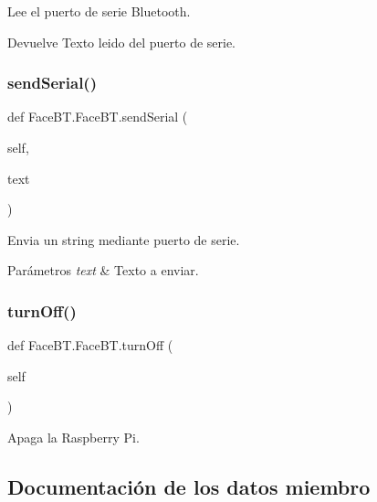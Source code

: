Lee el puerto de serie Bluetooth. 

\begin{DoxyReturn}{Devuelve}
Texto leido del puerto de serie. 
\end{DoxyReturn}
\mbox{\label{class_face_b_t_1_1_face_b_t_a6f362adf4c828653782877a661b4714d}} 
\subsubsection{\texorpdfstring{send\+Serial()}{sendSerial()}}
{\footnotesize\ttfamily def Face\+B\+T.\+Face\+B\+T.\+send\+Serial (\begin{DoxyParamCaption}\item[{}]{self,  }\item[{}]{text }\end{DoxyParamCaption})}



Envia un string mediante puerto de serie. 


\begin{DoxyParams}{Parámetros}
{\em text} & Texto a enviar. \\
\hline
\end{DoxyParams}
\mbox{\label{class_face_b_t_1_1_face_b_t_a4ca8c746966a8a3716113db50b0ce01d}} 
\subsubsection{\texorpdfstring{turn\+Off()}{turnOff()}}
{\footnotesize\ttfamily def Face\+B\+T.\+Face\+B\+T.\+turn\+Off (\begin{DoxyParamCaption}\item[{}]{self }\end{DoxyParamCaption})}



Apaga la Raspberry Pi. 



\subsection{Documentación de los datos miembro}
\mbox{\label{class_face_b_t_1_1_face_b_t_a8a32158fd07c69e41e9236481a6d4c83}} 
